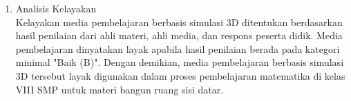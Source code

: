 \begin{enumerate}
\begin{enumerate}
        \item Analisis Kelayakan\\
        \hspace*{1cm}Kelayakan media pembelajaran berbasis simulasi 3D ditentukan berdasarkan hasil penilaian dari ahli materi, ahli media, dan respons peserta didik. Media pembelajaran dinyatakan layak apabila hasil penilaian berada pada kategori minimal "Baik (B)". Dengan demikian, media pembelajaran berbasis simulasi 3D tersebut layak digunakan dalam proses pembelajaran matematika di kelas VIII SMP untuk materi bangun ruang sisi datar.
    \end{enumerate}

\end{enumerate}

